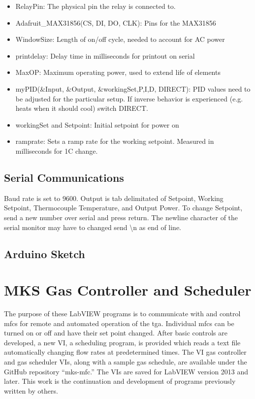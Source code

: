         \begin{itemize}
        \item
          RelayPin: The physical pin the relay is connected to.
        \item
          Adafruit\_MAX31856(CS, DI, DO, CLK): Pins for the MAX31856
        \item
          WindowSize: Length of on/off cycle, needed to account for AC power
        \item
          printdelay: Delay time in milliseconds for printout on serial
        \item
          MaxOP: Maximum operating power, used to extend life of elements
        \item
          myPID(\&Input, \&Output, \&workingSet,P,I,D, DIRECT): PID values need to be adjusted for the particular setup.
          If inverse behavior is experienced (e.g. heats when it should cool) switch DIRECT.
        \item
          workingSet and Setpoint: Initial setpoint for power on
        \item
          ramprate: Sets a ramp rate for the working setpoint. Measured in
          milliseconds for 1C change.
        \end{itemize}

    \subsection{Serial Communications}
        Baud rate is set to 9600.
        Output is tab delimitated of Setpoint, Working
        Setpoint, Thermocouple Temperature, and Output Power.
        To change Setpoint, send a new number over serial and press return.
        The newline character of the serial monitor may have to changed send \textbackslash n as end of line.

    \subsection{Arduino Sketch}
        

\section{MKS Gas Controller and Scheduler}
    \label{app:gasvi}
    The purpose of these LabVIEW programs is to communicate with and control \glspl{mfc} for remote and automated operation of the \gls{tga}.
    Individual \glspl{mfc} can be turned on or off and have their set point changed.
    After basic controls are developed, a new VI, a scheduling program, is provided which reads a text file automatically changing flow rates at predetermined times.
    The VI gas controller and gas scheduler VIs, along with a sample gas schedule, are available under the GitHub repository ``mks-mfc.''
    The VIs are saved for LabVIEW version 2013 and later.
    This work is the continuation and development of programs previously written by others.

